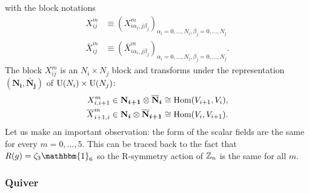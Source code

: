 \documentclass[a4paper,10pt]{article}
\begin{document}
            with the block notations
            \begin{align*}
                X^m_{ij}&\equiv (X^m_{i\alpha_i,j\beta_j})_{\alpha_i=0,\dots,N_i,\beta_j=0,\dots,N_j}\\
                \bar{X}^m_{ij}&\equiv (\bar{X}^m_{i\alpha_i,j\beta_j})_{\alpha_i=0,\dots,N_i,\beta_j=0,\dots,N_j}.
            \end{align*}
            The block $X^m_{ij}$ is an $N_i\times N_j$ block and transforms under the representation $(\boldsymbol{\textbf{N}_i},\boldsymbol{\bar{\textbf{N}}_j})$ of $\text{U}(N_i)\times\text{U}(N_j)$:
            \begin{align}
                X^m_{i,i+1} &\in \boldsymbol{\textbf{N}_{i+1}}\otimes\boldsymbol{\overline{\textbf{N}}_i} \cong \text{Hom}(V_{i+1},V_i),\\
                \overline{X}^m_{i+1,i} &\in \boldsymbol{\textbf{N}_{i}}\otimes\boldsymbol{\overline{\textbf{N}}_{i+1}} \cong \text{Hom}(V_{i},V_{i+1}).
            \end{align}
            Let us make an important observation: the form of the scalar fields are the same for every $m=0,\dots,5$. This can be traced back to the fact that $R(g)=\zeta_3\mathbbm{1}_6$ so the R-symmetry action of $\mathbb{Z}_n$ is the same for all $m$.

        \subsubsection{Quiver}
\end{document}
